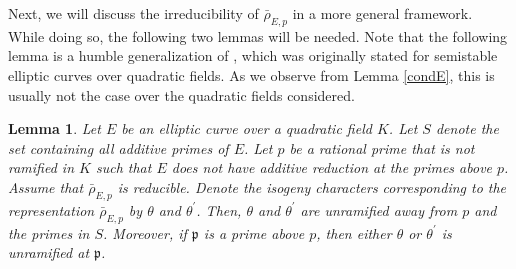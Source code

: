 \documentclass[]{article}
\newtheorem{lemma}{Lemma}
\begin{document}
Next, we will discuss the irreducibility of $\bar{\rho}_{E, p}$ in a more general framework. While doing so, the following two lemmas will be needed. Note that the following lemma is a humble generalization of \cite[Lemme 1]{kraus1996courbes}, which was originally stated for semistable elliptic curves over quadratic fields. As we observe from Lemma \ref{condE}, this is usually not the case over the quadratic fields considered.

\begin{lemma}\label{krausmodified}
    Let $E$ be an elliptic curve over a quadratic field $K$. Let $S$ denote the set containing all additive primes of $E$. Let $p$ be a rational prime that is not ramified in $K$ such that $E$ does not have additive reduction at the primes above $p$. Assume that $\bar{\rho}_{E, p}$ is reducible. Denote the isogeny characters corresponding to the representation $\bar{\rho}_{E, p}$ by $\theta$ and $\theta^{\prime}$. Then, $\theta$ and $\theta^{\prime}$ are unramified away from $p$ and the primes in $S$. Moreover, if $\mathfrak{p}$ is a prime above $p$, then either $\theta$ or $\theta^{\prime}$ is unramified at  $\mathfrak{p}$.
\end{lemma}
\end{document}

